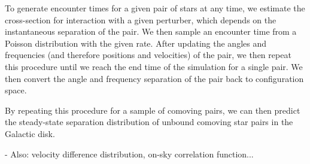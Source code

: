 \documentclass[modern, letterpaper]{aastex61}
\begin{document}
To generate encounter times for a given pair of stars at any time, we estimate
the cross-section for interaction with a given perturber, which depends on the
instantaneous separation of the pair.
We then sample an encounter time from a Poisson distribution with the given
rate.
After updating the angles and frequencies (and therefore positions and
velocities) of the pair, we then repeat this procedure until we reach the end
time of the simulation for a single pair.
We then convert the angle and frequency separation of the pair back to
configuration space.

By repeating this procedure for a sample of comoving pairs, we can then predict
the steady-state separation distribution of unbound comoving star pairs in the
Galactic disk.

 - Also: velocity difference distribution, on-sky correlation function...


\acknowledgements






\end{document}
